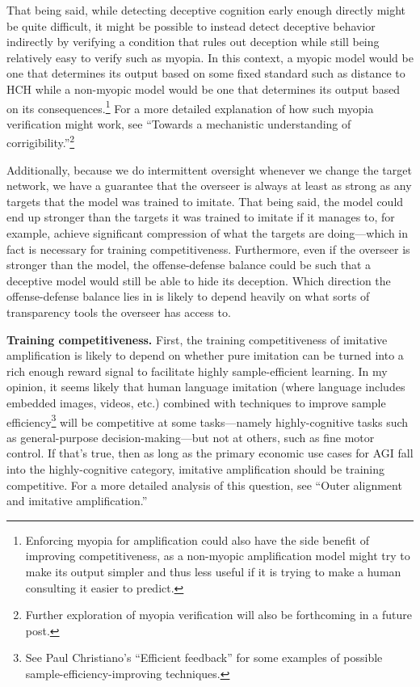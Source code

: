 \documentclass[
  onecolumn,
  natbib,
]{miri-tech-article}
\begin{document}
That being said, while detecting deceptive cognition early enough directly might be quite difficult, it might be possible to instead detect deceptive behavior indirectly by verifying a condition that rules out deception while still being relatively easy to verify such as myopia. In this context, a myopic model would be one that determines its output based on some fixed standard such as distance to HCH while a non-myopic model would be one that determines its output based on its consequences.\footnote{Enforcing myopia for amplification could also have the side benefit of improving competitiveness, as a non-myopic amplification model might try to make its output simpler and thus less useful if it is trying to make a human consulting it easier to predict.} For a more detailed explanation of how such myopia verification might work, see ``Towards a mechanistic understanding of corrigibility\cite{TODO: cite https://www.alignmentforum.org/posts/BKM8uQS6QdJPZLqCr/towards-a-mechanistic-understanding-of-corrigibility}.''\footnote{Further exploration of myopia verification will also be forthcoming in a future post.}

Additionally, because we do intermittent oversight whenever we change the target network, we have a guarantee that the overseer is always at least as strong as any targets that the model was trained to imitate. That being said, the model could end up stronger than the targets it was trained to imitate if it manages to, for example, achieve significant compression of what the targets are doing---which in fact is necessary for training competitiveness. Furthermore, even if the overseer is stronger than the model, the offense-defense balance could be such that a deceptive model would still be able to hide its deception. Which direction the offense-defense balance lies in is likely to depend heavily on what sorts of transparency tools the overseer has access to.

\textbf{Training competitiveness.} First, the training competitiveness of imitative amplification is likely to depend on whether pure imitation can be turned into a rich enough reward signal to facilitate highly sample-efficient learning. In my opinion, it seems likely that human language imitation (where language includes embedded images, videos, etc.) combined with techniques to improve sample efficiency\footnote{See Paul Christiano's ``Efficient feedback\cite{TODO: cite https://ai-alignment.com/efficient-feedback-a347748b1557}'' for some examples of possible sample-efficiency-improving techniques.} will be competitive at some tasks---namely highly-cognitive tasks such as general-purpose decision-making---but not at others, such as fine motor control. If that's true, then as long as the primary economic use cases for AGI fall into the highly-cognitive category, imitative amplification should be training competitive. For a more detailed analysis of this question, see ``Outer alignment and imitative amplification\cite{TODO: cite https://www.alignmentforum.org/posts/33EKjmAdKFn3pbKPJ/outer-alignment-and-imitative-amplification}.''
\end{document}
